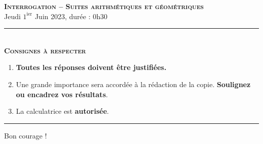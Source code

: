 \documentclass[11pt]{article}
\begin{document}

%
%
%

\begin{center}
\textbf{\LARGE \textsc{Interrogation -- Suites arithmétiques et
géométriques}}\\[2mm]

{\large Jeudi $1^\text{ier}$ Juin 2023, durée : 0h30}\\[1mm]
\noindent\rule{8cm}{0.4pt}\\[1mm]
\textbf{\textsc{Consignes à respecter}}
\begin{enumerate}[label=\textbf{\arabic*/}]
\item \textbf{Toutes les réponses doivent être justifiées.}
\item Une grande importance sera accordée à la rédaction de la
  copie. \textbf{Soulignez ou encadrez vos résultats}.
\item La calculatrice est \textbf{autorisée}.
    \end{enumerate}
\noindent\rule{12cm}{0.4pt}
\end{center}

\begin{center}
  Bon courage !
\end{center}
\end{document}
